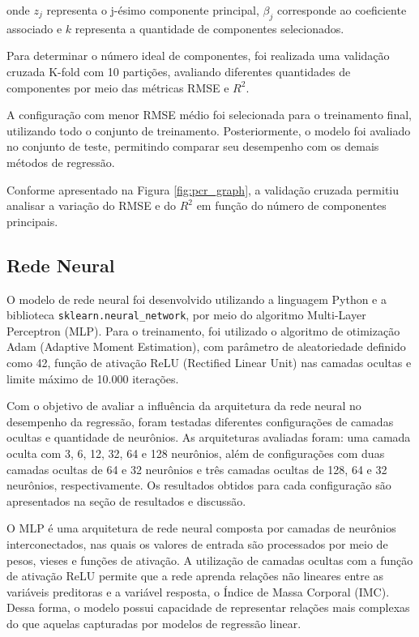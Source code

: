 \documentclass[conference]{IEEEtran}
\begin{document}
onde $z_j$ representa o j-ésimo componente principal, $\beta_j$ corresponde ao coeficiente associado e $k$ representa a quantidade de componentes selecionados.

Para determinar o número ideal de componentes, foi realizada uma validação cruzada K-fold com 10 partições, avaliando diferentes quantidades de componentes por meio das métricas RMSE e $R^2$.

A configuração com menor RMSE médio foi selecionada para o treinamento final, utilizando todo o conjunto de treinamento. Posteriormente, o modelo foi avaliado no conjunto de teste, permitindo comparar seu desempenho com os demais métodos de regressão.

Conforme apresentado na Figura \ref{fig:pcr_graph},
a validação cruzada permitiu analisar a variação
do RMSE e do $R^2$ em função do número de componentes principais.

\subsection{Rede Neural}
O modelo de rede neural foi desenvolvido utilizando a linguagem Python e a biblioteca \texttt{sklearn.neural\_network}, por meio do algoritmo Multi-Layer Perceptron (MLP). Para o treinamento, foi utilizado o algoritmo de otimização Adam (Adaptive Moment Estimation), com parâmetro de aleatoriedade definido como 42, função de ativação ReLU (Rectified Linear Unit) nas camadas ocultas e limite máximo de 10.000 iterações.

Com o objetivo de avaliar a influência da arquitetura da rede neural no desempenho da regressão, foram testadas diferentes configurações de camadas ocultas e quantidade de neurônios. As arquiteturas avaliadas foram: uma camada oculta com 3, 6, 12, 32, 64 e 128 neurônios, além de configurações com duas camadas ocultas de 64 e 32 neurônios e três camadas ocultas de 128, 64 e 32 neurônios, respectivamente. Os resultados obtidos para cada configuração são apresentados na seção de resultados e discussão.

O MLP é uma arquitetura de rede neural composta por camadas de neurônios interconectados, nas quais os valores de entrada são processados por meio de pesos, vieses e funções de ativação. A utilização de camadas ocultas com a função de ativação ReLU permite que a rede aprenda relações não lineares entre as variáveis preditoras e a variável resposta, o Índice de Massa Corporal (IMC). Dessa forma, o modelo possui capacidade de representar relações mais complexas do que aquelas capturadas por modelos de regressão linear.
\end{document}
